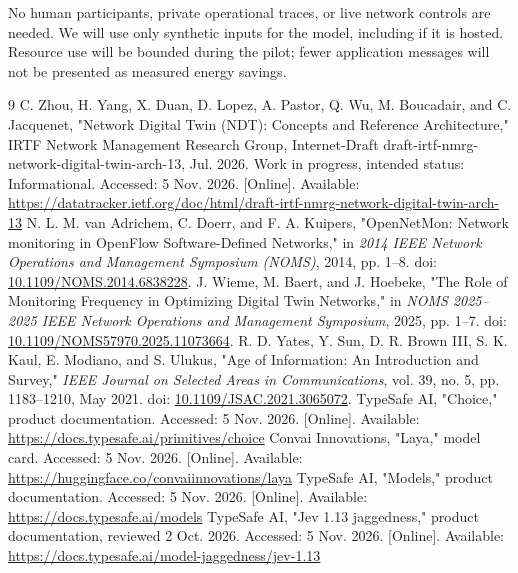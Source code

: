 \documentclass[11pt,a4paper]{article}
\begin{document}
No human participants, private operational traces, or live network controls are needed. We will use only synthetic inputs for the model, including if it is hosted. Resource use will be bounded during the pilot; fewer application messages will not be presented as measured energy savings.

\begin{thebibliography}{9}
 C. Zhou, H. Yang, X. Duan, D. Lopez, A. Pastor, Q. Wu, M. Boucadair, and C. Jacquenet, "Network Digital Twin (NDT): Concepts and Reference Architecture," IRTF Network Management Research Group, Internet-Draft draft-irtf-nmrg-network-digital-twin-arch-13, Jul. 2026. Work in progress, intended status: Informational. Accessed: 5 Nov. 2026. [Online]. Available: \url{https://datatracker.ietf.org/doc/html/draft-irtf-nmrg-network-digital-twin-arch-13}
 N. L. M. van Adrichem, C. Doerr, and F. A. Kuipers, "OpenNetMon: Network monitoring in OpenFlow Software-Defined Networks," in \emph{2014 IEEE Network Operations and Management Symposium (NOMS)}, 2014, pp. 1--8. doi: \href{https://doi.org/10.1109/NOMS.2014.6838228}{10.1109/NOMS.2014.6838228}.
 J. Wieme, M. Baert, and J. Hoebeke, "The Role of Monitoring Frequency in Optimizing Digital Twin Networks," in \emph{NOMS 2025--2025 IEEE Network Operations and Management Symposium}, 2025, pp. 1--7. doi: \href{https://doi.org/10.1109/NOMS57970.2025.11073664}{10.1109/NOMS57970.2025.11073664}.
 R. D. Yates, Y. Sun, D. R. Brown III, S. K. Kaul, E. Modiano, and S. Ulukus, "Age of Information: An Introduction and Survey," \emph{IEEE Journal on Selected Areas in Communications}, vol. 39, no. 5, pp. 1183--1210, May 2021. doi: \href{https://doi.org/10.1109/JSAC.2021.3065072}{10.1109/JSAC.2021.3065072}.
 TypeSafe AI, "Choice," product documentation. Accessed: 5 Nov. 2026. [Online]. Available: \url{https://docs.typesafe.ai/primitives/choice}
 Convai Innovations, "Laya," model card. Accessed: 5 Nov. 2026. [Online]. Available: \url{https://huggingface.co/convaiinnovations/laya}
 TypeSafe AI, "Models," product documentation. Accessed: 5 Nov. 2026. [Online]. Available: \url{https://docs.typesafe.ai/models}
 TypeSafe AI, "Jev 1.13 jaggedness," product documentation, reviewed 2 Oct. 2026. Accessed: 5 Nov. 2026. [Online]. Available: \url{https://docs.typesafe.ai/model-jaggedness/jev-1.13}
\end{thebibliography}
\end{document}
